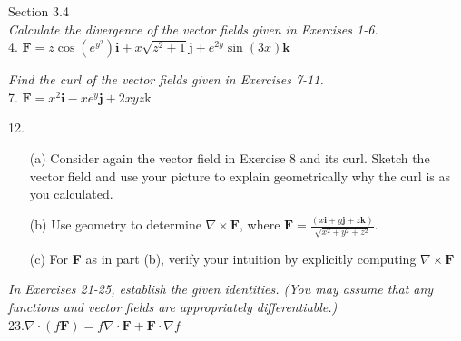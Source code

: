 \documentclass[12pt,letterpaper]{hmcpset}
\begin{document}
\begin{problem}
Section 3.4\\
\textit{Calculate the divergence of the vector fields given in Exercises 1-6.}\\
4. $\mathbf{F}= z \cos (e^{y^2}) \mathbf{i} + x\sqrt{z^2 + 1} \mathbf{j} + e^{2y} \sin (3x) \mathbf{k}$
\end{problem}
\newpage


\begin{problem}
\textit{Find the curl of the vector fields given in Exercises 7-11.}\\
7. $\mathbf{F} = x^2\mathbf{i} − xe^y\mathbf{j} + 2xyz\mathrm{k}$
\end{problem}
\newpage


\begin{problem}
12.
\begin{enumerate}
    \item[(a)]Consider again the vector field in Exercise 8 and its curl. Sketch the vector field and use your picture to explain geometrically why the curl is as you calculated.
    \item[(b)] Use geometry to determine $\nabla \times \mathbf{F}$, where $\mathbf{F}=\frac{(x\mathbf{i}+y\mathbf{j}+z\mathbf{k})}{\sqrt{x^2+y^2+z^2}}$.
    \item[(c)] For \textbf{F} as in part (b), verify your intuition by explicitly computing $\nabla \times \mathbf{F}$
\end{enumerate}
\end{problem}
\newpage


\begin{problem}
\textit{In Exercises 21-25, establish the given identities. (You may assume that any functions and vector fields are appropriately differentiable.)}\\
23.$\nabla \cdot (f\mathbf{F})=f\nabla \cdot \mathbf{F} + \mathbf{F} \cdot \nabla f$ 
\end{problem}


\end{document}
